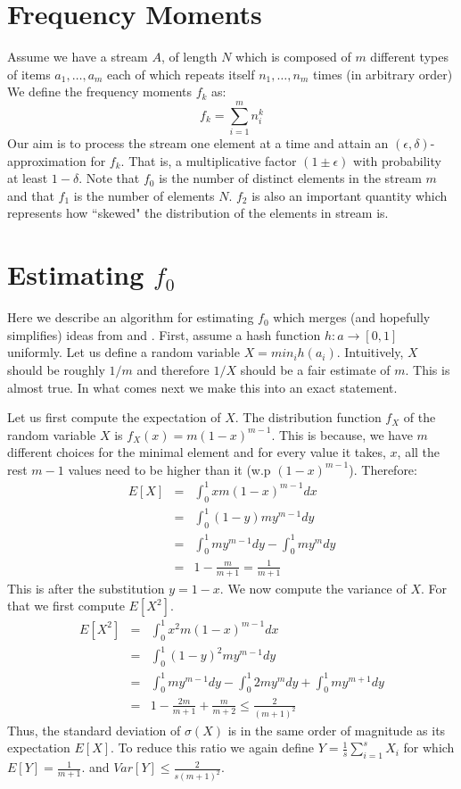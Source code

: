 \documentclass{article}
\begin{document}
 
\section*{Frequency Moments}
Assume we have a stream $A$, of length $N$ which is composed of $m$ 
different types of items $a_1,\ldots,a_m$ each of which repeats itself $n_1,\ldots,n_m$ times (in arbitrary order)
We define the frequency moments $f_k$ as:
\[
f_k = \sum_{i=1}^{m} n_{i}^{k}
\]
%
Our aim is to process the stream one element at a time and attain an $(\epsilon,\delta)$-approximation for $f_k$.
That is, a multiplicative factor $(1\pm\epsilon)$ with probability at least $1-\delta$.  
Note that $f_0$ is the number of distinct elements in the stream $m$ and that $f_1$ is the number of elements $N$.
$f_2$ is also an important quantity which represents how ``skewed" the distribution of the elements in stream is.

\section*{Estimating $f_0$}
Here we describe an algorithm for estimating $f_0$ 
which merges (and hopefully simplifies) ideas from \cite{AMS96} and \cite{Cohen97}.
First, assume a hash function $h: a \rightarrow [0,1]$ uniformly.
Let us define a random variable $X = min_{i}h(a_i)$.
Intuitively, $X$ should be roughly $1/m$ and therefore $1/X$ should be a fair estimate of $m$.
This is almost true. In what comes next we make this into an exact statement.

Let us first compute the expectation of $X$. The distribution function $f_X$ of the random variable $X$
is $f_X(x) = m(1-x)^{m-1}$. This is because, we have $m$ different choices for the minimal 
element and for every value it takes, $x$, all the rest $m-1$ values
need to be higher than it (w.p $(1-x)^{m-1}$). Therefore:
\begin{eqnarray*}
E[X] &=& \int_{0}^{1} x m (1-x)^{m-1}dx \\
&=& \int_{0}^{1} (1- y) m y^{m-1}dy \\
&=& \int_{0}^{1} m y^{m-1}dy - \int_{0}^{1} m y^{m}dy\\
&=& 1- \frac{m}{m+1} = \frac{1}{m+1}
\end{eqnarray*}
This is after the substitution $y = 1-x$. We now compute the variance of $X$.
For that we first compute $E[X^2]$.
\begin{eqnarray*}
E[X^2] &=& \int_{0}^{1} x^2 m (1-x)^{m-1}dx \\
&=& \int_{0}^{1} (1- y)^2 m y^{m-1}dy \\
&=& \int_{0}^{1} m y^{m-1}dy - \int_{0}^{1} 2 m y^{m}dy + \int_{0}^{1}  m y^{m+1}dy\\
&=& 1- \frac{2m}{m+1} + \frac{m}{m+2} \le \frac{2}{(m+1)^2}
\end{eqnarray*}
Thus, the standard deviation of $\sigma(X)$ is in the same order of magnitude as its expectation $E[X]$.
To reduce this ratio we again define $Y = \frac{1}{s}\sum_{i=1}^{s}X_i$ for which $E[Y] = \frac{1}{m+1}$.
and $Var[Y] \le \frac{2}{s(m+1)^2}$.
\end{document}
